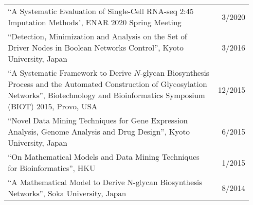 \begin{longtable}{Xr}

``A Systematic Evaluation of Single-Cell RNA-seq 2:45 Imputation Methods", ENAR 2020 Spring Meeting&3/2020\\ %

``Detection, Minimization and Analysis on the Set of Driver Nodes in Boolean Networks Control'', Kyoto University, Japan&3/2016\\

``A Systematic Framework to Derive $N$-glycan Biosynthesis Process and the Automated Construction of Glycosylation Networks'', Biotechnology and Bioinformatics Symposium (BIOT) 2015, Provo, USA&12/2015\\

``Novel Data Mining Techniques for Gene Expression Analysis, Genome Analysis and Drug Design'', Kyoto University, Japan&6/2015\\

``On Mathematical Models and Data Mining Techniques for Bioinformatics'', HKU&1/2015\\

``A Mathematical Model to Derive N-glycan Biosynthesis Networks'', Soka University, Japan&8/2014\\

\end{longtable}

